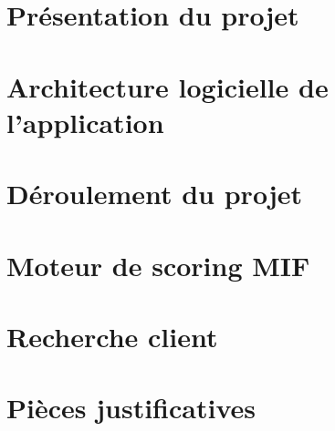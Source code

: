 
\section{Présentation du projet}
	

\section{Architecture logicielle de l'application}
	

\section{Déroulement du projet}
	
	
\section{Moteur de scoring MIF}
	\label{moteurScoring}
	
	
\section{Recherche client}
	
	
\section{Pièces justificatives}
	

